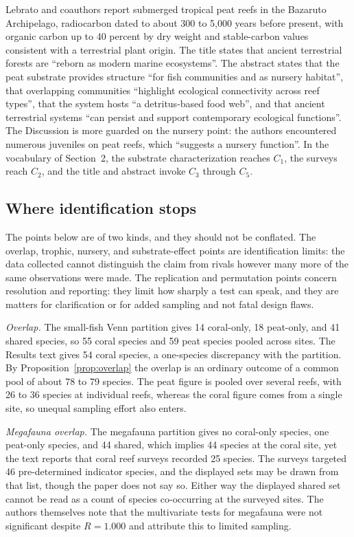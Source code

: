 \documentclass[11pt]{article}
\theoremstyle{definition}
\theoremstyle{remark}
\begin{document}
Lebrato and coauthors \cite{lebrato2026} report submerged tropical peat reefs in the Bazaruto Archipelago, radiocarbon dated to about 300 to 5,000 years before present, with organic carbon up to 40 percent by dry weight and stable-carbon values consistent with a terrestrial plant origin. The title states that ancient terrestrial forests are ``reborn as modern marine ecosystems''. The abstract states that the peat substrate provides structure ``for fish communities and as nursery habitat'', that overlapping communities ``highlight ecological connectivity across reef types'', that the system hosts ``a detritus-based food web'', and that ancient terrestrial systems ``can persist and support contemporary ecological functions''. The Discussion is more guarded on the nursery point: the authors encountered numerous juveniles on peat reefs, which ``suggests a nursery function''. In the vocabulary of Section~2, the substrate characterization reaches $C_1$, the surveys reach $C_2$, and the title and abstract invoke $C_3$ through $C_5$.

\subsection{Where identification stops}

The points below are of two kinds, and they should not be conflated. The overlap, trophic, nursery, and substrate-effect points are identification limits: the data collected cannot distinguish the claim from rivals however many more of the same observations were made. The replication and permutation points concern resolution and reporting: they limit how sharply a test can speak, and they are matters for clarification or for added sampling and not fatal design flaws.

\emph{Overlap.} The small-fish Venn partition gives 14 coral-only, 18 peat-only, and 41 shared species, so 55 coral species and 59 peat species pooled across sites. The Results text gives 54 coral species, a one-species discrepancy with the partition. By Proposition~\ref{prop:overlap} the overlap is an ordinary outcome of a common pool of about 78 to 79 species. The peat figure is pooled over several reefs, with 26 to 36 species at individual reefs, whereas the coral figure comes from a single site, so unequal sampling effort also enters.

\emph{Megafauna overlap.} The megafauna partition gives no coral-only species, one peat-only species, and 44 shared, which implies 44 species at the coral site, yet the text reports that coral reef surveys recorded 25 species. The surveys targeted 46 pre-determined indicator species, and the displayed sets may be drawn from that list, though the paper does not say so. Either way the displayed shared set cannot be read as a count of species co-occurring at the surveyed sites. The authors themselves note that the multivariate tests for megafauna were not significant despite $R=1.000$ and attribute this to limited sampling.
\end{document}
